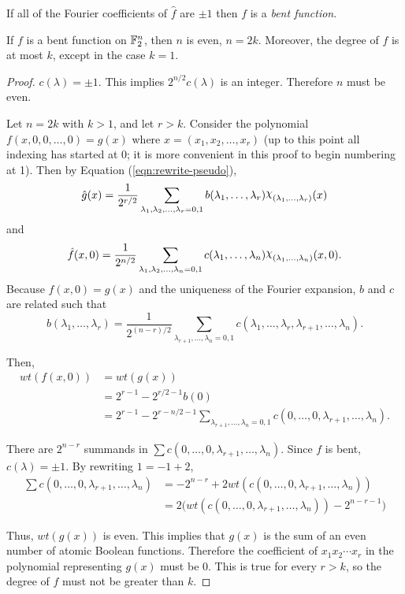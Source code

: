 \begin{definition}\label{def:bent-function}
  If all of the Fourier coefficients of $\hat{f}$ are $\pm1$ then
  $f$ is a \textit{bent function}.
\end{definition}

\begin{theorem}{\rm \cite{art:r76}}\label{thm:deg-of-bent-function}
	If $f$ is a bent function on $\mathbb{F}_2^n$, then $n$ is even, $n=2k$.
  Moreover,
	the degree of $f$ is at most $k$, except in the case $k=1$.
\end{theorem}
\begin{proof}
  \par $c(\lambda)=\pm1$. This implies $2^{n/2}c(\lambda)$ is an
  integer. Therefore $n$ must be even.
  \par Let $n=2k$ with $k>1$, and let $r>k$. Consider the polynomial
  $f(x,\allowbreak 0,0,\dots,0)=\allowbreak g(x)$ where $x=(x_1,x_2,\dots,x_r)$
  (up to this point all indexing has
  started at 0; it is more convenient in this proof to begin numbering at
  1). Then by Equation (\ref{eqn:rewrite-pseudo}),
  \[
  \hat{g}(x)=\frac{1}{2^{r/2}}\sum_{\lambda_1,\lambda_2,\dots,\lambda_r=0,1}
    b(\lambda_1,\dots,\lambda_r)\Chi_{(\lambda_1,\ldots,\lambda_r)}(x)
  \]
  and
  \[
	\hat{f}(x,0)=\frac{1}{2^{n/2}}
    \sum_{\lambda_1,\lambda_2,\dots,\lambda_n=0,1}
    c(\lambda_1,\dots,\lambda_n)\Chi_{(\lambda_1,\ldots,\lambda_n)}(x,0).
  \]
  Because $f(x,0)=g(x)$ and the uniqueness of the Fourier expansion, $b$ and
  $c$ are related such that
  \[
  b(\lambda_1,\dots,\lambda_r)
    =\frac{1}{2^{(n-r)/2}}\sum_{\lambda_{r+1},\dots,\lambda_n=0,1}
    c(\lambda_1,\dots,\lambda_r,\lambda_{r+1},\dots,\lambda_n).
  \]
  \par Then,
  \begin{align*}
  wt(f(x,0))&=wt(g(x))\\
    &=2^{r-1}-2^{r/2-1}b(0)\\
    &=2^{r-1}-2^{r-n/2-1}\sum_{\lambda_{r+1},\dots,\lambda_n=0,1}
      c(0,\dots,0,\lambda_{r+1},\dots,\lambda_n).
  \end{align*}
  \par There are $2^{n-r}$ summands in
  $\sum{c(0,\dots,0,\lambda_{r+1},\dots,\lambda_n)}.$ Since $f$ is bent,
  $c(\lambda)=\pm1$. By rewriting $1=-1+2$,
  \begin{align*}
    \sum{c(0,\dots,0,\lambda_{r+1},\dots,\lambda_n)}
      &=-2^{n-r}+2wt(c(0,\dots,0,\lambda_{r+1},\dots,\lambda_n))\\
      &=2\big(wt(c(0,\dots,0,\lambda_{r+1},\dots,\lambda_n))-2^{n-r-1}\big)
  \end{align*}
  \par Thus, $wt(g(x))$ is even. This implies that $g(x)$ is the sum of an
  even number of atomic Boolean functions. Therefore the coefficient of
  $x_1x_2\cdots x_r$ in the polynomial representing $g(x)$ must be 0. This
  is true for every $r>k$, so the degree of $f$ must not be greater than
  $k$.
\end{proof}

